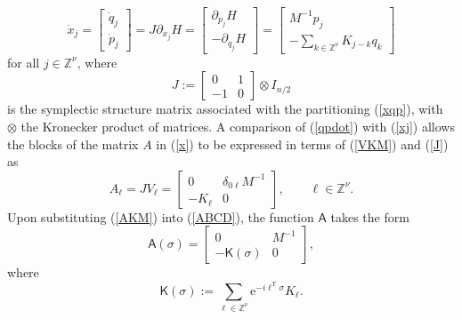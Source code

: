 \documentclass[letterpaper, 10pt, conference]{ieeeconf}  %
\def\d{\partial}
\def\mZ{\mathbb{Z}}    %
\def\rT{\mathrm{T}}        %
\def\re{\mathrm{e}}        %
\def\ox{\otimes}
\def\sK{\mathsf{K}}
\def\sA{\mathsf{A}}
\def\mZ{\mathbb{Z}}
\begin{document}
\begin{equation}
\label{qpdot}
    \dot{x}_j
    =
    \begin{bmatrix}
        \dot{q}_j\\
        \dot{p}_j
    \end{bmatrix}
    =
    J \d_{x_j}H
    =
    \begin{bmatrix}
        \d_{p_j}H\\
        -\d_{q_j}H
    \end{bmatrix}
    =
    \begin{bmatrix}
        M^{-1} p_j\\
        -\sum_{k\in \mZ^\nu}
    K_{j-k} q_k
    \end{bmatrix}
\end{equation}
for all $j\in \mZ^\nu$,
where
\begin{equation}
\label{J}
    J:=
    \begin{bmatrix}
        0 & 1 \\
        -1 & 0
    \end{bmatrix}
    \ox I_{n/2}
\end{equation}
is the symplectic structure matrix associated with the partitioning (\ref{xqp}), with $\ox$ the Kronecker product of matrices. A comparison of (\ref{qpdot}) with (\ref{xj}) allows the blocks of the matrix $A$ in (\ref{x}) to be expressed in terms of (\ref{VKM}) and (\ref{J}) as
\begin{equation}
\label{AKM}
  A_{\ell}
  =
  J V_{\ell}
  =
    \begin{bmatrix}
        0 & \delta_{0\ell}M^{-1}\\
        -K_\ell & 0
    \end{bmatrix},
    \qquad
    \ell \in \mZ^\nu.
\end{equation}
Upon substituting (\ref{AKM}) into (\ref{ABCD}),
the function $\sA$ takes the form
\begin{equation}
\label{sAKM}
  \sA(\sigma)
  =
    \begin{bmatrix}
        0 & M^{-1}\\
        -\sK(\sigma) & 0
    \end{bmatrix},
\end{equation}
where
\begin{equation}
\label{sK}
    \sK(\sigma)
    :=
    \sum_{\ell\in \mZ^\nu}
    \re^{-i\ell^{\rT}\sigma}
    K_\ell.
\end{equation}
\end{document}
